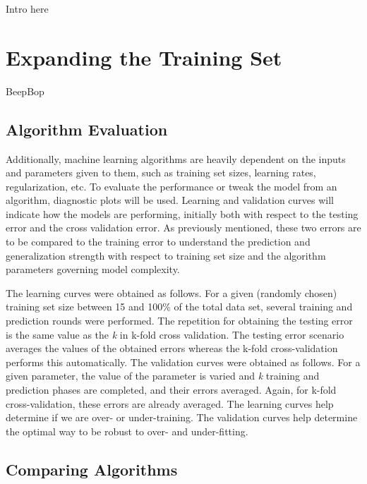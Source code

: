 Intro here

\section{Expanding the Training Set}
\label{sec:newtrain}

BeepBop
\subsection{Algorithm Evaluation}

Additionally, machine learning algorithms are heavily dependent on the inputs
and parameters given to them, such as training set sizes, learning rates,
regularization, etc. To evaluate the performance or tweak the model from an
algorithm, diagnostic plots will be used. Learning and validation curves will
indicate how the models are performing, initially both with respect to the
testing error and the cross validation error. As previously mentioned, these
two errors are to be compared to the training error to understand the
prediction and generalization strength with respect to training set size and
the algorithm parameters governing model complexity. 

The learning curves were obtained as follows. For a given (randomly chosen)
training set size between 15 and 100\% of the total data set, several training
and prediction rounds were performed. The repetition for obtaining the testing
error is the same value as the \textit{k} in k-fold cross validation. The
testing error scenario averages the values of the obtained errors whereas the
k-fold cross-validation performs this automatically.  The validation curves
were obtained as follows. For a given parameter, the value of the parameter is
varied and \textit{k} training and prediction phases are completed, and their
errors averaged. Again, for k-fold cross-validation, these errors are already
averaged. The learning curves help determine if we are over- or under-training.
The validation curves help determine the optimal way to be robust to over- and
under-fitting. 



\subsection{Comparing Algorithms}

